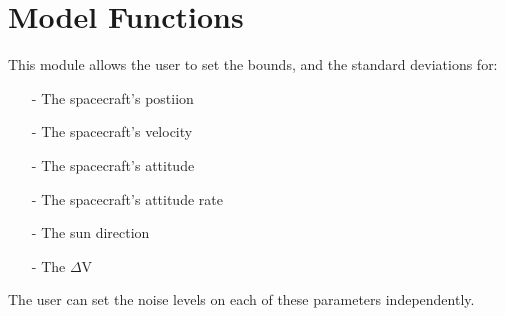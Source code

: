 \section{Model Functions}

This module allows the user to set the bounds, and the standard deviations for:

\begin{itemize}
\item[-] The spacecraft's postiion
\item[-] The spacecraft's velocity
\item[-] The spacecraft's attitude
\item[-] The spacecraft's attitude rate
\item[-] The sun direction
\item[-] The $\Delta $V
\end{itemize}

The user can set the noise levels on each of these parameters independently. 